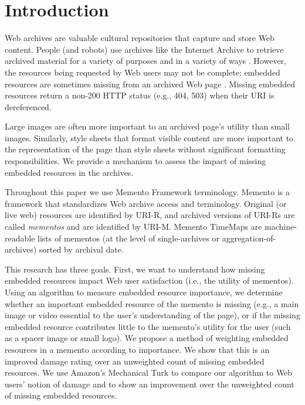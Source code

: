 \section{Introduction}
\label{introduction}
Web archives are valuable cultural repositories that capture and store Web content. People (and robots) use archives like the Internet Archive \cite{iawebarchive, waybackarchives2} to retrieve archived material \cite{usingIA, marshalls_social_media_study} for a variety of purposes and in a variety of ways \cite{yasminLinks}. However, the resources being requested by Web users may not be complete; embedded resources are sometimes missing from an archived Web page \cite{ipresArchivability}. Missing embedded resources return a non-200 HTTP status (e.g., 404, 503) when their URI is dereferenced.

Large images are often more important to an archived page's utility than small images. Similarly, style sheets that format visible content are more important to the representation of the page than style sheets without significant formatting responsibilities. We provide a mechanism to assess the impact of missing embedded resources in the archives.

Throughout this paper we use Memento Framework terminology. Memento \cite{nelson:memento:tr} is a framework that standardizes Web archive access and terminology. Original (or live web) resources are identified by URI-R, and archived versions of URI-Rs are called \emph{mementos} and are identified by URI-M. Memento TimeMaps are machine-readable lists of mementos (at the level of single-archives or aggregation-of-archives) sorted by archival date.

This research has three goals. First, we want to understand how missing embedded resources impact Web user satisfaction (i.e., the utility of mementos). Using an algorithm to measure embedded resource importance, we determine whether an important embedded resource of the memento is missing (e.g., a main image or video essential to the user's understanding of the page), or if the missing embedded resource contributes little to the memento's utility for the user (such as a spacer image or small logo). We propose a method of weighting embedded resources in a memento according to importance. We show that this is an improved damage rating over an unweighted count of missing embedded resources. We use Amazon's Mechanical Turk to compare our algorithm to Web users' notion of damage and to show an improvement over the unweighted count of missing embedded resources.

